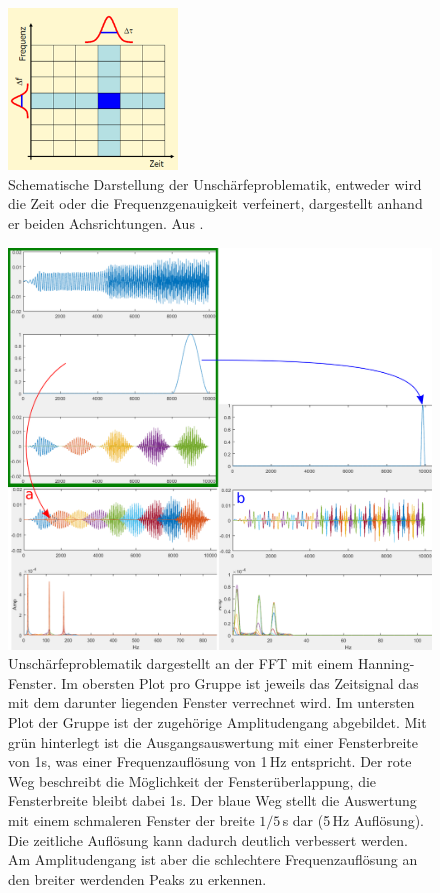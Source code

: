 \begin{figure}
	\centering
	\includegraphics[width=0.4\textwidth]{papers/wavelets/images/6-1_FFTAufloesung.png}
	\caption{Schematische Darstellung
	der Unschärfeproblematik, entweder wird die Zeit oder die
	Frequenzgenauigkeit verfeinert, dargestellt anhand er beiden
	Achsrichtungen.
	Aus \cite{wavelets:J.Mayer.2002}.
}
	\label{wavelet:fig:FFTAufloesung}
\end{figure}

\begin{figure}
	\centering
	\includegraphics[width=\textwidth]{papers/wavelets/images/6-2_AufloesungZeitVsFrequenz.png}
	\caption{Unschärfeproblematik dargestellt an der FFT mit
	einem Hanning-Fenster. Im obersten Plot pro Gruppe ist
%
	jeweils das Zeitsignal das mit dem darunter liegenden Fenster
	verrechnet wird. Im untersten Plot der Gruppe ist der
	zugehörige Amplitudengang abgebildet.
	Mit grün hinterlegt ist die Ausgangsauswertung mit einer
	Fensterbreite von 1s, was einer Frequenzauflösung von 1\,Hz
	entspricht.
	Der rote Weg beschreibt die Möglichkeit der Fensterüberlappung,
	die Fensterbreite bleibt dabei 1s.
	Der blaue Weg stellt die Auswertung mit einem schmaleren
	Fenster der breite $1/5$\,s dar (5\,Hz Auflösung).
	Die zeitliche Auflösung kann dadurch deutlich verbessert werden.
	Am Amplitudengang ist aber die schlechtere Frequenzauflösung
	an den breiter werdenden Peaks zu erkennen.}
	\label{wavelet:fig:AufloesungZeitVsFrequenz}
\end{figure}

